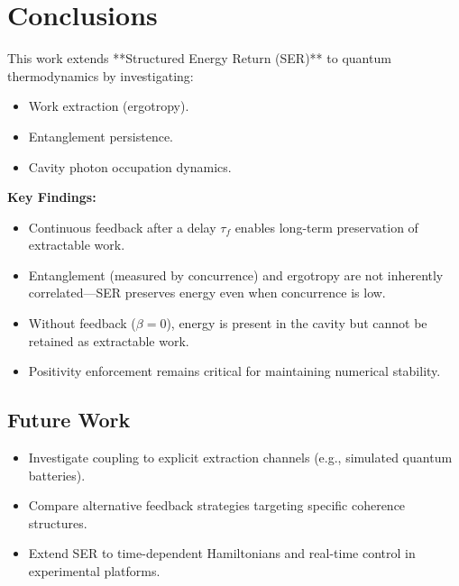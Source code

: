 \documentclass[a4paper,11pt]{article}
\begin{document}
\section{Conclusions}
This work extends **Structured Energy Return (SER)** to quantum thermodynamics by investigating:
\begin{itemize}
    \item Work extraction (ergotropy).
    \item Entanglement persistence.
    \item Cavity photon occupation dynamics.
\end{itemize}

\textbf{Key Findings:}
\begin{itemize}
  \item Continuous feedback after a delay $\tau_f$ enables long-term preservation of extractable work.
  \item Entanglement (measured by concurrence) and ergotropy are not inherently correlated—SER preserves energy even when concurrence is low.
  \item Without feedback ($\beta = 0$), energy is present in the cavity but cannot be retained as extractable work.
  \item Positivity enforcement remains critical for maintaining numerical stability.
\end{itemize}

\subsection*{Future Work}

\begin{itemize}
  \item Investigate coupling to explicit extraction channels (e.g., simulated quantum batteries).
  \item Compare alternative feedback strategies targeting specific coherence structures.
  \item Extend SER to time-dependent Hamiltonians and real-time control in experimental platforms.
\end{itemize}
\end{document}
